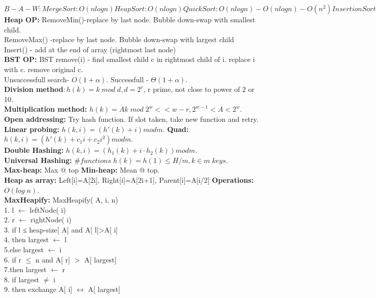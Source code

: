 \documentclass[paper=a4, fontsize=10pt]{scrartcl} %
\begin{document}
$B-A-W :MergeSort: O(nlogn) HeapSort: O(nlogn) QuickSort: O(nlogn)-O(nlogn)-O(n^2) InsertionSort: O(n)-O(n^2)-O(n^2) BubbleSort: O(n)-O(n^2)-O(n^2)$\\
\textbf{Heap OP:}
RemoveMin()-replace by last node. Bubble down-swap with smallest child.\\
RemoveMax() -replace by last node. Bubble down-swap with largest child\\
Insert() - add at the end of array (rightmost last node)\\
\textbf{BST OP:}
BST remove(i) - find smallest child c in rightmost child of i. replace i with c. remove original c.\\
Unsuccessfull search- $O(1+\alpha)$. Successfull - $\Theta(1+\alpha)$.\\
\textbf{Division method}$: h(k)=k \; mod\; d, d=2^r$, r prime, not close to power of 2 or 10.\\
\textbf{Multiplication method:} $h(k)=Ak \; mod \; 2^w << w -r, 2^{w-1} < A < 2^w$.\\
\textbf{Open addressing:} Try hash function. If slot taken, take new function and retry.\\
\textbf{Linear probing:} $h ( k, i ) = ( h '( k) + i ) mod m$. \textbf{Quad: } $h ( k, i ) = ( h '( k) + c_1i + c_2i^2 ) mod m$.\\
\textbf{Double Hashing: }$h ( k, i ) = ( h_1( k) + i ⋅ h_2( k)) mod m$.\\
\textbf{Universal Hashing: }$\# functions \; h(k)=h(1) \leq H/m, k \in m \; keys$.\\
\textbf{Max-heap:} Max @ top \textbf{Min-heap:} Mean @ top.\\
\textbf{Heap as array: } Left[i]=A[2i], Right[i]=A[2i+1], Parent[i]=A[i/2] \textbf{Operations: }$O(log \; n)$.\\
\textbf{MaxHeapify:} MaxHeapify( A, i, n)\\
1. l $\leftarrow$ leftNode( i)\\
2. r $\leftarrow$ rightNode( i)\\
3. if l ≤ heap-size[ A] and A[ l]>A[ i]\\
4.	\indent then largest $\leftarrow$ l\\
5.\indent	 else largest $\leftarrow$ i\\
6.  if r $\leq$ n and A[ r] $>$ A[ largest]\\
7.\indent	 then largest $\leftarrow$ r\\
8. if largest $\neq$ i\\
9. \indent then exchange A[ i] $\leftrightarrow$ A[ largest]\\
\end{document}
